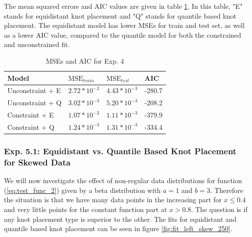 \documentclass[10pt,a4paper]{article}
\begin{document}
The mean squared errors and AIC values are given in table \ref{tab:metrics_4}. In this table, "E" stands for equidistant knot placement and "Q" stands for quantile based knot placement. The equidistant model has lower MSEs for train and test set, as well as a lower AIC value, compared to the quantile model for both the constrained and unconstrained fit. 

\begin{table}[h]
	\centering
	\begin{tabular}{|l|l|l|l|}
		\hline
		\textbf{Model} & \textbf{$\text{MSE}_{train}$} & \textbf{$\text{MSE}_{test}$}  & \textbf{AIC} \\ \hline \toprule
		Unconstraint + E  & $2.72 * 10^{-3}$  & $4.43 * 10^{-3}$ & -280.7       \\ \hline
		Unconstraint + Q  & $3.02 * 10^{-3}$  & $5.20 * 10^{-3}$ & -208.2       \\ \hline
		Constraint + E    & $1.07 * 10^{-3}$  & $1.11 * 10^{-3}$ & -379.9       \\ \hline
		Constraint + Q    & $1.24 * 10^{-3}$  & $1.31 * 10^{-3}$ & -334.4       \\ \hline \bottomrule
	\end{tabular}
	\caption{MSEs and AIC for Exp. 4}
	\label{tab:metrics_4}
\end{table}


\subsubsection{Exp. 5.1: Equidistant vs. Quantile Based Knot Placement for Skewed Data} \label{subsubsec:left_skew}

We will now investigate the effect of non-regular data distributions for function (\ref{eq:test_func_2}) given by a beta distribution with $a = 1$ and $b = 3$. Therefore the situation is that we have many data points in the increasing part for $x \le 0.4$ and very little points for the constant function part at $x > 0.8$. The question is if any knot placement type is superior to the other. The fits for equidistant and quantile based knot placement can be seen in figure \ref{fig:fit_left_skew_250}. 
\end{document}

